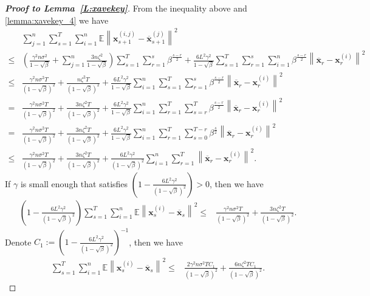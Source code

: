 \begin{proof} [\textbf{Proof to Lemma~\ref{L:xavekey}}]
From the inequality above and \eqref{lemma:xavekey_4} we have
\begin{align*}
&\sum_{j=1}^n\sum_{s=1}^T\sum_{i=1}^n\mathbb E\left\|\bm{x}_{s+1}^{(i,j)} - \overline{\bm{x}}_{s+1}^{(j)}\right\|^2 \\
\leq & \left(\frac{\gamma^2n\sigma^2}{1-\sqrt{\beta}} + \sum_{j=1}^n\frac{3n\zeta^2}{1-\sqrt{\beta}}\right)\sum_{s=1}^T\sum_{r=1}^s\beta^{\frac{s-r}{2}} + \frac{6L^2\gamma^2}{1-\sqrt{\beta}}\sum_{s=1}^T\sum_{r=1}^s\sum_{i=1}^n\beta^{\frac{s-r}{2}}\left\|\overline{\bm{x}}_r- \bm{x}_r^{(i)}\right\|^2\\
\leq & \frac{\gamma^2n\sigma^2T}{(1-\sqrt{\beta})^2} + \frac{n\zeta^2T}{(1-\sqrt{\beta})^2} + \frac{6L^2\gamma^2}{1-\sqrt{\beta}}\sum_{i=1}^n\sum_{s=1}^T\sum_{r=1}^s\beta^{\frac{s-r}{2}}\left\|\overline{\bm{x}}_r- \bm{x}_r^{(i)}\right\|^2\\
= & \frac{\gamma^2n\sigma^2T}{(1-\sqrt{\beta})^2} + \frac{3n\zeta^2T}{(1-\sqrt{\beta})^2} + \frac{6L^2\gamma^2}{1-\sqrt{\beta}}\sum_{i=1}^n\sum_{r=1}^T\sum_{s=r}^T\beta^{\frac{s-r}{2}}\left\|\overline{\bm{x}}_r- \bm{x}_r^{(i)}\right\|^2\\
= & \frac{\gamma^2n\sigma^2T}{(1-\sqrt{\beta})^2} + \frac{3n\zeta^2T}{(1-\sqrt{\beta})^2} + \frac{6L^2\gamma^2}{1-\sqrt{\beta}}\sum_{i=1}^n\sum_{r=1}^T\sum_{s=0}^{T-r}\beta^{\frac{s}{2}}\left\|\overline{\bm{x}}_r- \bm{x}_r^{(i)}\right\|^2\\
\leq  & \frac{\gamma^2n\sigma^2T}{(1-\sqrt{\beta})^2} + \frac{3n\zeta^2T}{(1-\sqrt{\beta})^2} + \frac{6L^2\gamma^2}{(1-\sqrt{\beta})^2}\sum_{i=1}^n\sum_{r=1}^T\left\|\overline{\bm{x}}_r- \bm{x}_r^{(i)}\right\|^2.
\end{align*}
If $\gamma$ is small enough that satisfies $\left(1- \frac{6L^2\gamma^2}{(1-\sqrt{\beta})^2} \right) > 0$, then we have
\begin{align*}
\left(1- \frac{6L^2\gamma^2}{(1-\sqrt{\beta})^2} \right) \sum_{s=1}^T\sum_{i=1}^n\mathbb E\left\|\bm{x}_{s}^{(i)} - \overline{\bm{x}}_{s}\right\|^2 \leq & \frac{\gamma^2n\sigma^2T}{(1-\sqrt{\beta})^2} + \frac{3n\zeta^2T}{(1-\sqrt{\beta})^2}.
\end{align*}
Denote $C_1:=\left(1- \frac{6L^2\gamma^2}{(1-\sqrt{\beta})^2} \right)^{-1}$, then we have
\begin{align*}
\sum_{s=1}^T\sum_{i=1}^n\mathbb E\left\|\bm{x}_{s}^{(i)} - \overline{\bm{x}}_{s}\right\|^2 \leq & \frac{2\gamma^2n\sigma^2TC_1}{(1-\sqrt{\beta})^2} + \frac{6n\zeta^2TC_1}{(1-\sqrt{\beta})^2}.
\end{align*}

\end{proof}



